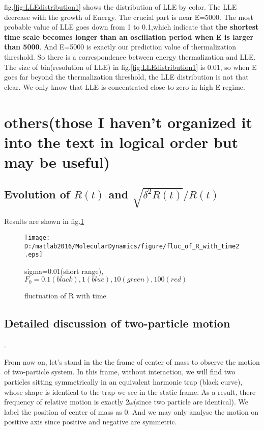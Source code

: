 \documentclass[aps,pre,twocolumn
,groupedaddress]{revtex4-1}
\begin{document}
fig.\ref{fig:LLEdistribution1} shows the distribution of LLE by color. The LLE decrease with the growth of Energy. The crucial part is near E=5000. The most probable value of LLE goes down from 1 to 0.1,which indicate that \textbf{the shortest time scale becomes longer than an oscillation period when E is larger than 5000}. And E=5000 is exactly our prediction value of thermalization threshold. So there is a correspondence between energy thermalization and LLE. 
The size of bin(resolution of LLE) in fig.\ref{fig:LLEdistribution1} is 0.01, so when E goes far beyond the thermalization threshold, the LLE distribution is not that clear. We only know that LLE is concentrated close to zero in high E regime.

 




\section{others(those I haven't organized it into the text in logical order but may be useful)}

\subsection{Evolution of $R(t)$ and $\sqrt{\delta^2R(t)}/R(t)$} 
Results are shown in fig.\ref{fig:others1}

\begin{figure}[hbtp]

\centering
\texttt{[image: D:/matlab2016/MolecularDynamics/figure/fluc\_of\_R\_with\_time2.eps]}
\caption{fluctuation of R with time }
sigma=0.01(short range), $F_0=0.1(black), 1(blue), 10(green) ,100(red)$
\label{fig:others1}
\end{figure}


\subsection{Detailed discussion of two-particle motion}
{\color{red}{This chapter previously follow the subsection ``two-particle case" in subsection ``Dynamics study" in section ``Thermalization". But then I found we haven't used these result. So I put it at the end for the time being}}.
  

From now on, let's stand in the the frame of center of mass to observe the motion of two-particle system. In this frame, without interaction, we will find two particles sitting symmetrically in an equivalent harmonic trap (black curve), whose shape is identical to the trap we see in the static frame. As a result, there frequency of relative motion is exactly $2\omega$(since two particle are identical). We label the position of center of mass as 0. And we may only analyse the motion on positive axis since positive and negative are symmetric. 
\end{document}
